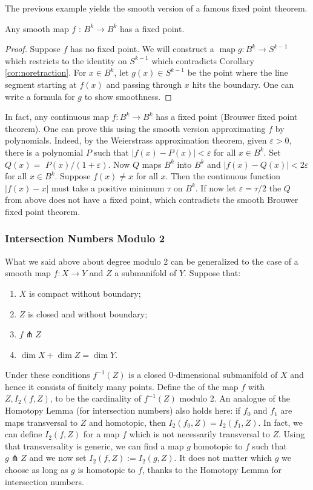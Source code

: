 The previous example yields the smooth version of a famous fixed point theorem.

\begin{theorem}
    Any smooth map $f$ : $B^{k} \rightarrow B^{k}$ has a fixed point.
\end{theorem}
\begin{proof}
    Suppose $f$ has no fixed point. We will construct a $\operatorname{map} g: B^{k} \rightarrow S^{k-1}$ which restricts to the identity on $S^{k-1}$ which contradicts Corollary \ref{cor:noretraction}. For $x \in B^{k}$, let $g(x) \in S^{k-1}$ be the point where the line segment starting at $f(x)$ and passing through $x$ hits the boundary. One can write a formula for $g$ to show smoothness.
\end{proof}

In fact, any continuous map $f: B^{k} \rightarrow B^{k}$ has a fixed point (Brouwer fixed point theorem). One can prove this using the smooth version approximating $f$ by polynomials. Indeed, by the Weierstrass approximation theorem, given $\varepsilon>0$, there is a polynomial $P$ such that $|f(x)-P(x)|<\varepsilon$ for all $x \in B^{k}$. Set $Q(x)=$ $P(x) /(1+\varepsilon)$. Now $Q$ maps $B^{k}$ into $B^{k}$ and $|f(x)-Q(x)|<2 \varepsilon$ for all $x \in B^{k}$. Suppose $f(x) \neq x$ for all $x$. Then the continuous function $|f(x)-x|$ must take a positive minimum $\tau$ on $B^{k}$. If now let $\varepsilon=\tau / 2$ the $Q$ from above does not have a fixed point, which contradicts the smooth Brouwer fixed point theorem.

\subsubsection{Intersection Numbers Modulo 2}

What we said above about degree modulo 2 can be generalized to the case of a smooth map $f: X \rightarrow Y$ and $Z$ a submanifold of $Y$. Suppose that:
\begin{enumerate}
    \item $X$ is compact without boundary;
    \item $Z$ is closed and without boundary;
    \item $f \pitchfork Z$
    \item $\operatorname{dim} X+\operatorname{dim} Z=\operatorname{dim} Y$.
\end{enumerate}
Under these conditions $f^{-1}(Z)$ is a closed 0-dimensional submanifold of $X$ and hence it consists of finitely many points. Define the  of the map $f$ with $Z, I_{2}(f, Z)$, to be the cardinality of $f^{-1}(Z)$ modulo 2. An analogue of the Homotopy Lemma (for intersection numbers) also holds here: if $f_{0}$ and $f_{1}$ are maps transversal to $Z$ and homotopic, then $I_{2}\left(f_{0}, Z\right)=I_{2}\left(f_{1}, Z\right)$. In fact, we can define $I_{2}(f, Z)$ for a map $f$ which is not necessarily transversal to $Z$. Using that transversality is generic, we can find a map $g$ homotopic to $f$ such that $g \pitchfork Z$ and we now set $I_{2}(f, Z):=I_{2}(g, Z)$. It does not matter which $g$ we choose as long as $g$ is homotopic to $f$, thanks to the Homotopy Lemma for intersection numbers.

